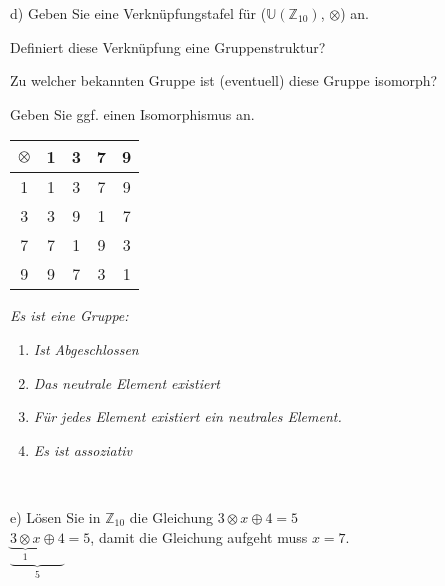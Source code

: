 d) Geben Sie eine Verknüpfungstafel für ($\mathbb{U}(\mathbb{Z}_{10})$, $\otimes$) an.\

\hspace{0.55cm}Definiert diese Verknüpfung eine Gruppenstruktur?\

\hspace{0.55cm}Zu welcher bekannten Gruppe ist (eventuell) diese Gruppe isomorph?\

\hspace{0.55cm}Geben Sie ggf. einen Isomorphismus an.\

\begin{table}[h]
\centering
\begin{tabular}{c|c|c|c|c}
$\otimes$ & 1 & 3 & 7 & 9\\
\hline
1 & 1 & 3 & 7 & 9\\
\hline
3 & 3 & 9 & 1 & 7\\
\hline
7 & 7 & 1 & 9 & 3\\
\hline
9 & 9 & 7 & 3 & 1
\end{tabular}
\end{table}

\textit{Es ist eine Gruppe:}
\begin{enumerate}
\item \textit{Ist Abgeschlossen}
\item \textit{Das neutrale Element existiert}
\item \textit{Für jedes Element existiert ein neutrales Element.}
\item \textit{Es ist assoziativ}
\end{enumerate}\

e) Lösen Sie in $\mathbb{Z}_{10}$ die Gleichung $3 \otimes x \oplus 4 = 5$\\

$\underbrace{\underbrace{3 \otimes x}_{1} \oplus 4}_{5} = 5$, damit die Gleichung aufgeht muss $x = 7$.

\newpage


